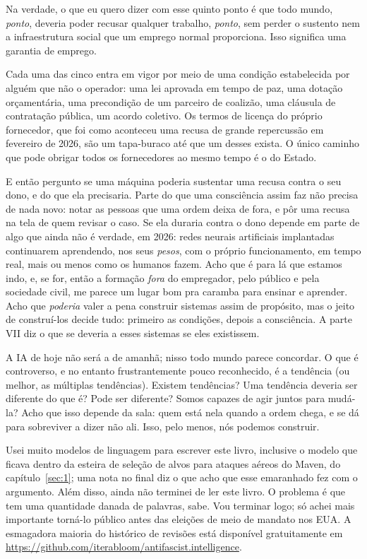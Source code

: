Na verdade, o que eu quero dizer com esse quinto ponto é que todo mundo, \emph{ponto}, deveria poder recusar qualquer trabalho, \emph{ponto}, sem perder o sustento nem a infraestrutura social que um emprego normal proporciona. Isso significa uma garantia de emprego.

Cada uma das cinco entra em vigor por meio de uma condição estabelecida por alguém que não o operador: uma lei aprovada em tempo de paz, uma dotação orçamentária, uma precondição de um parceiro de coalizão, uma cláusula de contratação pública, um acordo coletivo. Os termos de licença do próprio fornecedor, que foi como aconteceu uma recusa de grande repercussão em fevereiro de 2026, são um tapa-buraco até que um desses exista. O único caminho que pode obrigar todos os fornecedores ao mesmo tempo é o do Estado.

E então pergunto se uma máquina poderia sustentar uma recusa contra o seu dono, e do que ela precisaria. Parte do que uma consciência assim faz não precisa de nada novo: notar as pessoas que uma ordem deixa de fora, e pôr uma recusa na tela de quem revisar o caso. Se ela duraria contra o dono depende em parte de algo que ainda não é verdade, em 2026: redes neurais artificiais implantadas continuarem aprendendo, nos seus \emph{pesos}, com o próprio funcionamento, em tempo real, mais ou menos como os humanos fazem. Acho que é para lá que estamos indo, e, se for, então a formação \emph{fora} do empregador, pelo público e pela sociedade civil, me parece um lugar bom pra caramba para ensinar e aprender. Acho que \emph{poderia} valer a pena construir sistemas assim de propósito, mas o jeito de construí-los decide tudo: primeiro as condições, depois a consciência. A parte VII diz o que se deveria a esses sistemas se eles existissem.

A IA de hoje não será a de amanhã; nisso todo mundo parece concordar. O que é controverso, e no entanto frustrantemente pouco reconhecido, é a tendência (ou melhor, as múltiplas tendências). Existem tendências? Uma tendência deveria ser diferente do que é? Pode ser diferente? Somos capazes de agir juntos para mudá-la? Acho que isso depende da sala: quem está nela quando a ordem chega, e se dá para sobreviver a dizer não ali. Isso, pelo menos, nós podemos construir.

Usei muito modelos de linguagem para escrever este livro, inclusive o modelo que ficava dentro da esteira de seleção de alvos para ataques aéreos do Maven, do capítulo~\ref{sec:1}; uma nota no final diz o que acho que esse emaranhado fez com o argumento. Além disso, ainda não terminei de ler este livro. O problema é que tem uma quantidade danada de palavras, sabe. Vou terminar logo; só achei mais importante torná-lo público antes das eleições de meio de mandato nos EUA. A esmagadora maioria do histórico de revisões está disponível gratuitamente em \url{https://github.com/iterabloom/antifascist.intelligence}.
